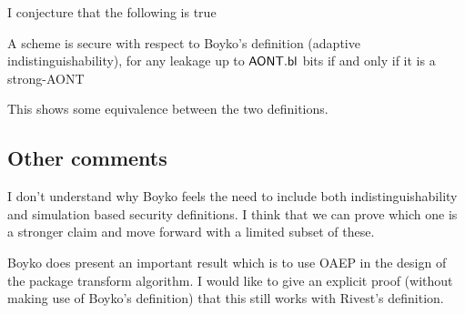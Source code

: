 \documentclass[11pt,twoside]{article}
\begin{document}
I conjecture that the following is true

\begin{theorem}
A scheme is secure with respect to Boyko's definition (adaptive indistinguishability), for any leakage up to $\mathsf{AONT.bl}$ bits if and only if it is a strong-AONT
\end{theorem}

This shows some equivalence between the two definitions.

\subsection{Other comments} 

I don't understand why Boyko feels the need to include both indistinguishability and simulation based security definitions. I think that we can prove which one is a stronger claim and move forward with a limited subset of these. 

Boyko does present an important result which is to use OAEP in the design of the package transform algorithm. I would like to give an explicit proof (without making use of Boyko's definition) that this still works with Rivest's definition. 
\appendix
\end{document}
